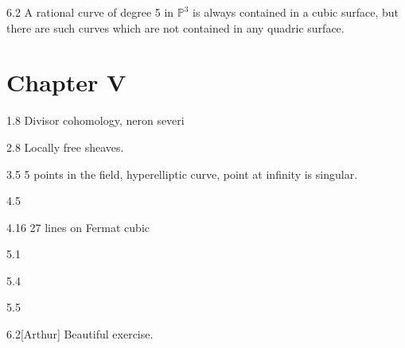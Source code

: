 \begin{manualexercise}{6.2}
	A rational curve of degree 5 in $\mathbb{P}^{3}$ is always contained in a cubic surface, but there  are such curves which are not contained in any quadric surface.  
\end{manualexercise}

\chapter{Chapter V}

\begin{manualexercise}{1.8}
	Divisor cohomology, neron severi
\end{manualexercise}

\begin{manualexercise}{2.8}
	Locally free sheaves.
\end{manualexercise}

\begin{manualexercise}{3.5}
	5 points in the field, hyperelliptic curve, point at infinity is singular.
\end{manualexercise}

\begin{manualexercise}{4.5}
	
\end{manualexercise}

\begin{manualexercise}{4.16}
	27 lines on Fermat cubic
\end{manualexercise}

\begin{manualexercise}{5.1}
	
\end{manualexercise}

\begin{manualexercise}{5.4}
	
\end{manualexercise}

\begin{manualexercise}{5.5}
	
\end{manualexercise}

\begin{manualexercise}{6.2}[Arthur]
	Beautiful exercise.
\end{manualexercise}


